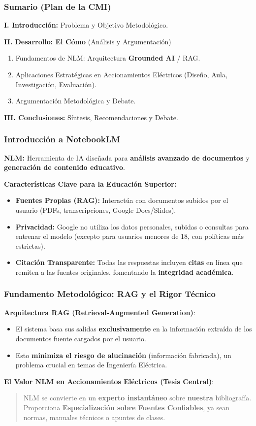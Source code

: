 \documentclass[aspectratio=43]{beamer}
\begin{document}
\begin{frame}
\frametitle{Sumario (Plan de la CMI)}

\textbf{I. Introducción:} Problema y Objetivo Metodológico.

\textbf{II. Desarrollo: El Cómo} (Análisis y Argumentación)
\begin{enumerate}
    \item Fundamentos de NLM: Arquitectura \textbf{Grounded AI} / RAG.
    \item Aplicaciones Estratégicas en Accionamientos Eléctricos (Diseño, Aula, Investigación, Evaluación).
    \item Argumentación Metodológica y Debate.
\end{enumerate}

\textbf{III. Conclusiones:} Síntesis, Recomendaciones y Debate.
\end{frame}

\begin{frame}
\frametitle{Introducción a NotebookLM}

\textbf{NLM:} Herramienta de IA diseñada para \textbf{análisis avanzado de documentos} y \textbf{generación de contenido educativo}.

\vfill
\textbf{Características Clave para la Educación Superior:}
\begin{itemize}
    \item \textbf{Fuentes Propias (RAG):} Interactúa con documentos subidos por el usuario (PDFs, transcripciones, Google Docs/Slides).
    \item \textbf{Privacidad:} Google no utiliza los datos personales, subidas o consultas para entrenar el modelo (excepto para usuarios menores de 18, con políticas más estrictas).
    \item \textbf{Citación Transparente:} Todas las respuestas incluyen \textbf{citas} en línea que remiten a las fuentes originales, fomentando la \textbf{integridad académica}.
\end{itemize}
\end{frame}

\begin{frame}
\frametitle{Fundamento Metodológico: RAG y el Rigor Técnico}

\textbf{Arquitectura RAG (Retrieval-Augmented Generation)}:
\begin{itemize}
    \item El sistema basa sus salidas \textbf{exclusivamente} en la información extraída de los documentos fuente cargados por el usuario.
    \item Esto \textbf{minimiza el riesgo de alucinación} (información fabricada), un problema crucial en temas de Ingeniería Eléctrica.
\end{itemize}
\vfill
\textbf{El Valor NLM en Accionamientos Eléctricos (Tesis Central)}:
\begin{quote}
NLM se convierte en un \textbf{experto instantáneo} sobre \textbf{nuestra} bibliografía. Proporciona \textbf{Especialización sobre Fuentes Confiables}, ya sean normas, manuales técnicos o apuntes de clases.
\end{quote}
\end{frame}
\end{document}
